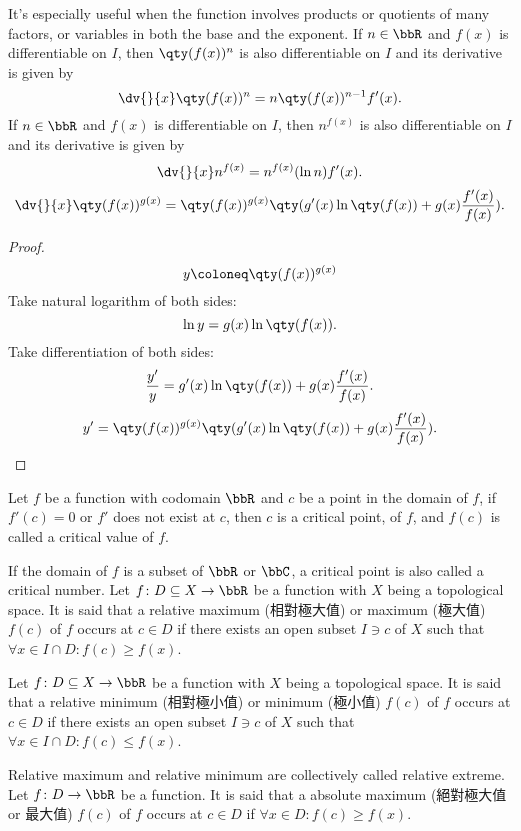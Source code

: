\documentclass[a4paper,12pt]{report}
\begin{document}
\begin{itemize}
\begin{itemize}
It’s especially useful when the function involves products or quotients of many factors, or variables in both the base and the exponent.
If $n\in\bbR$ and $f(x)$ is differentiable on $I$, then $\qty(f(x))^n$ is also differentiable on $I$ and its derivative is given by
\[\dv{}{x}\qty(f(x))^n=n\qty(f(x))^{n-1}f'(x).\]
If $n\in\bbR$ and $f(x)$ is differentiable on $I$, then $n^{f(x)}$ is also differentiable on $I$ and its derivative is given by
\[\dv{}{x}n^{f(x)}=n^{f(x)}(\ln n)f'(x).\]
\[\dv{}{x}\qty(f(x))^{g(x)}=\qty(f(x))^{g(x)}\qty(g'(x)\ln\qty(f(x))+g(x)\frac{f'(x)}{f(x)}).\]
\begin{proof}
\[y\coloneq\qty(f(x))^{g(x)}\]
Take natural logarithm of both sides:
\[\ln y=g(x)\ln\qty(f(x)).\]
Take differentiation of both sides:
\[\frac{y'}{y}=g'(x)\ln\qty(f(x))+g(x)\frac{f'(x)}{f(x)}.\]
\[y'=\qty(f(x))^{g(x)}\qty(g'(x)\ln\qty(f(x))+g(x)\frac{f'(x)}{f(x)}).\]
\end{proof}
Let $f$ be a function with codomain $\bbR$ and \( c \) be a point in the domain of $f$, if \( f'(c) = 0 \) or \( f' \) does not exist at \( c \), then \( c \) is a critical point, of \( f \), and $f(c)$ is called a critical value of $f$.

If the domain of $f$ is a subset of $\bbR$ or $\bbC$, a critical point is also called a critical number.
Let $f\colon D\subseteq X\to\bbR$ be a function with $X$ being a topological space. It is said that a relative maximum (相對極大值) or maximum (極大值) \( f(c) \) of \(f\) occurs at $c\in D$ if there exists an open subset $I\ni c$ of $X$ such that \( \forall x\in I\cap D\colon f(c) \geq f(x) \).

Let $f\colon D\subseteq X\to\bbR$ be a function with $X$ being a topological space. It is said that a relative minimum (相對極小值) or minimum (極小值) \( f(c) \) of \(f\) occurs at $c\in D$ if there exists an open subset $I\ni c$ of $X$ such that \( \forall x\in I\cap D\colon f(c) \leq f(x) \).

Relative maximum and relative minimum are collectively called relative extreme.
Let $f\colon D\to\bbR$ be a function. It is said that a absolute maximum (絕對極大值 or 最大值) \( f(c) \) of \(f\) occurs at $c\in D$ if \( \forall x\in D\colon f(c) \geq f(x) \).


\end{itemize}
\end{itemize}
\end{document}
